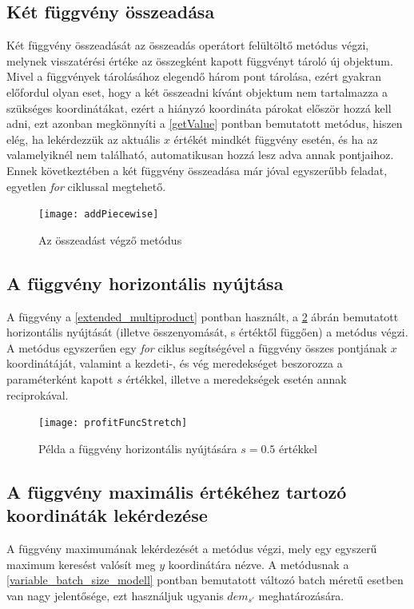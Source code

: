 \subsection{Két függvény összeadása} \label{addPiecewiseLinearFunction}
Két függvény összeadását az összeadás operátort felültöltő metódus végzi, melynek visszatérési értéke az összegként kapott függvényt tároló új  objektum.
Mivel a függvények tárolásához elegendő három pont tárolása, ezért gyakran előfordul olyan eset, hogy a két összeadni kívánt  objektum nem tartalmazza a szükséges koordinátákat, ezért a hiányzó koordináta párokat először hozzá kell adni, ezt azonban megkönnyíti a \ref{getValue} pontban bemutatott metódus, hiszen elég, ha lekérdezzük az aktuális $x$ értékét mindkét függvény esetén, és ha az valamelyiknél nem található, automatikusan hozzá lesz adva annak pontjaihoz.
Ennek következtében a két függvény összeadása már jóval egyszerűbb feladat, egyetlen \textit{for} ciklussal megtehető.
\begin{figure}[H]
\begin{center}
\texttt{[image: addPiecewise]}
\caption{Az összeadást végző metódus}
\label{add_piecewise}
\end{center}
\end{figure}
\subsection{A függvény horizontális nyújtása} \label{stretch}
A függvény a \ref{extended_multiproduct} pontban használt, a \ref{profit_func_stretch} ábrán bemutatott horizontális nyújtását (illetve összenyomását, s értéktől függően) a  metódus végzi.
A metódus egyszerűen egy \textit{for} ciklus segítségével a függvény összes pontjának $x$ koordinátáját, valamint a kezdeti-, és vég meredekséget beszorozza a paraméterként kapott $s$ értékkel, illetve a meredekségek esetén annak reciprokával. 
\begin{figure}
\begin{center}
\texttt{[image: profitFuncStretch]}
\caption{Példa a függvény horizontális nyújtására $s=0.5$ értékkel}
\label{profit_func_stretch}
\end{center}
\end{figure}
\subsection{A függvény maximális értékéhez tartozó koordináták lekérdezése}
A függvény maximumának lekérdezését a  metódus végzi, mely egy egyszerű maximum keresést valósít meg $y$ koordinátára nézve.
A metódusnak a \ref{variable_batch_size_modell} pontban bemutatott változó batch méretű esetben van nagy jelentősége, ezt használjuk ugyanis $dem_{s'}$ meghatározására.
